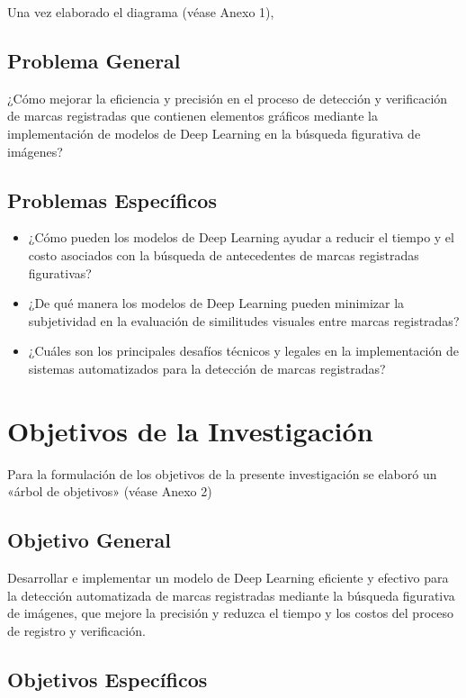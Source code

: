 Una vez elaborado el diagrama (véase Anexo 1), 

\subsection{Problema General}
\newcommand{\ProblemaGeneral}{
	¿Cómo mejorar la eficiencia y precisión en el proceso de detección y verificación de marcas registradas que contienen elementos gráficos mediante la implementación de modelos de Deep Learning en la búsqueda figurativa de imágenes?
}
\ProblemaGeneral
\subsection{Problemas Espec\'{i}ficos}
\newcommand{\Pbone}{
¿Cómo pueden los modelos de Deep Learning ayudar a reducir el tiempo y el costo asociados con la búsqueda de antecedentes de marcas registradas figurativas?
}
\newcommand{\Pbtwo}{
¿De qué manera los modelos de Deep Learning pueden minimizar la subjetividad en la evaluación de similitudes visuales entre marcas registradas?
}
\newcommand{\Pbthree}{
¿Cuáles son los principales desafíos técnicos y legales en la implementación de sistemas automatizados para la detección de marcas registradas?
}

\begin{itemize}
	\item \Pbone
	\item \Pbtwo
	\item \Pbthree
\end{itemize}

\section{Objetivos de la Investigación}
Para la formulación de los objetivos de la presente investigación se elaboró un «árbol de objetivos» (véase Anexo 2) 
\subsection{Objetivo General}
\newcommand{\ObjetivoGeneral}{
Desarrollar e implementar un modelo de Deep Learning eficiente y efectivo para la detección automatizada de marcas registradas mediante la búsqueda figurativa de imágenes, que mejore la precisión y reduzca el tiempo y los costos del proceso de registro y verificación.
}
\ObjetivoGeneral
\subsection{Objetivos Espec\'{i}ficos}
\newcommand{\Objone}{
Diseñar un modelo de Deep Learning que identifique con alta precisión similitudes y diferencias entre marcas registradas que incluyan elementos gráficos.
}
\newcommand{\Objtwo}{
Evaluar la capacidad del modelo propuesto para operar dentro de los marcos legales y normativos existentes relacionados con las marcas registradas.
}
\newcommand{\Objthree}{
Implementar una prueba de concepto del modelo desarrollado para demostrar su aplicabilidad y beneficios en un entorno real de registro de marcas.
}

